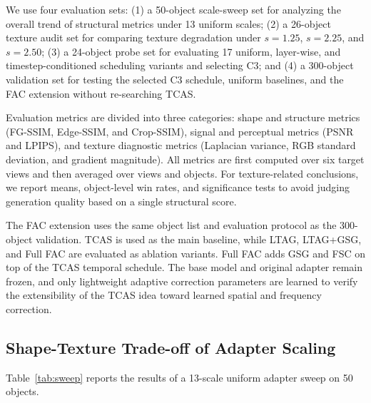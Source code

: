 \documentclass[times,twocolumn,final]{elsarticle}
\begin{document}
We use four evaluation sets: (1) a 50-object scale-sweep set for analyzing the overall trend of structural metrics under 13 uniform scales; (2) a 26-object texture audit set for comparing texture degradation under $s = 1.25$, $s = 2.25$, and $s = 2.50$; (3) a 24-object probe set for evaluating 17 uniform, layer-wise, and timestep-conditioned scheduling variants and selecting C3; and (4) a 300-object validation set for testing the selected C3 schedule, uniform baselines, and the FAC extension without re-searching TCAS.

Evaluation metrics are divided into three categories: shape and structure metrics (FG-SSIM, Edge-SSIM, and Crop-SSIM), signal and perceptual metrics (PSNR and LPIPS), and texture diagnostic metrics (Laplacian variance, RGB standard deviation, and gradient magnitude). All metrics are first computed over six target views and then averaged over views and objects. For texture-related conclusions, we report means, object-level win rates, and significance tests to avoid judging generation quality based on a single structural score.

The FAC extension uses the same object list and evaluation protocol as the 300-object validation. TCAS is used as the main baseline, while LTAG, LTAG+GSG, and Full FAC are evaluated as ablation variants. Full FAC adds GSG and FSC on top of the TCAS temporal schedule. The base model and original adapter remain frozen, and only lightweight adaptive correction parameters are learned to verify the extensibility of the TCAS idea toward learned spatial and frequency correction.

\subsection{Shape-Texture Trade-off of Adapter Scaling}
\label{subsec:tradeoff}

Table~\ref{tab:sweep} reports the results of a 13-scale uniform adapter sweep on 50 objects.
\end{document}
